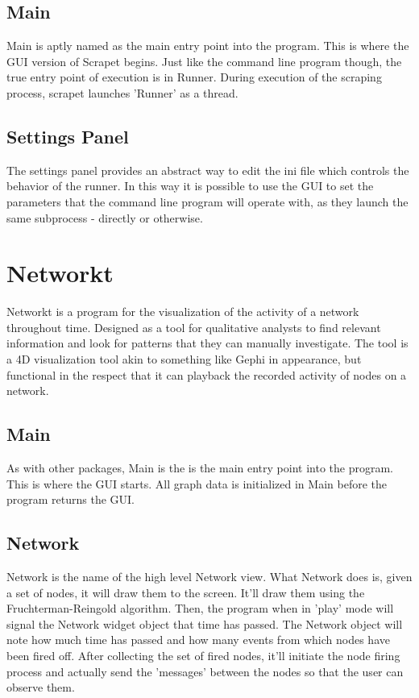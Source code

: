 \subsection{Main}
Main is aptly named as the main entry point into the program. This is where the GUI version of Scrapet begins. Just like the command line program though, the true entry point of execution is in Runner. During execution of the scraping process, scrapet launches 'Runner' as a thread.

\subsection{Settings Panel}
The settings panel provides an abstract way to edit the ini file which controls the behavior of the runner. In this way it is possible to use the GUI to set the parameters that the command line program will operate with, as they launch the same subprocess - directly or otherwise.

\section{Networkt}
Networkt is a program for the visualization of the activity of a network throughout time. Designed as a tool for qualitative analysts to find relevant information and look for patterns that they can manually investigate. The tool is a 4D visualization tool akin to something like Gephi in appearance, but functional in the respect that it can playback the recorded activity of nodes on a network.

\subsection{Main}
As with other packages, Main is the is the main entry point into the program. This is where the GUI starts. All graph data is initialized in Main before the program returns the GUI.

\subsection{Network}
Network is the name of the high level Network view. What Network does is, given a set of nodes, it will draw them to the screen. It'll draw them using the Fruchterman-Reingold algorithm. Then, the program when in 'play' mode will signal the Network widget object that time has passed. The Network object will note how much time has passed and how many events from which nodes have been fired off. After collecting the set of fired nodes, it'll initiate the node firing process and actually send the 'messages' between the nodes so that the user can observe them.

